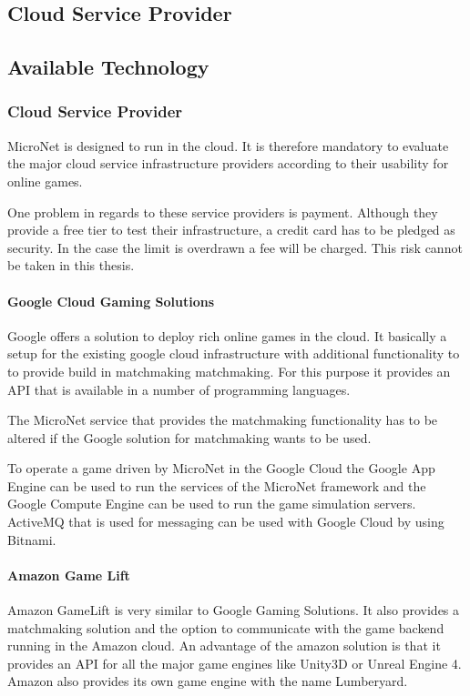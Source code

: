 \subsection{Cloud Service Provider}

\subsection{Available Technology}

\subsubsection{Cloud Service Provider}

MicroNet is designed to run in the cloud. It is therefore mandatory to evaluate
the major cloud service infrastructure providers according to their usability
for online games.

One problem in regards to these service providers is payment. Although they
provide a free tier to test their infrastructure, a credit card has to be
pledged as security. In the case the limit is overdrawn a fee will be charged.
This risk cannot be taken in this thesis. 

\paragraph{Google Cloud Gaming Solutions}

Google offers a solution to deploy rich online games in the cloud. It basically
a setup for the existing google cloud infrastructure with additional
functionality to to provide build in matchmaking matchmaking. For this purpose
it provides an API that is available in a number of programming languages.

The MicroNet service that provides the matchmaking functionality has to be
altered if the Google solution for matchmaking wants to be used. 

To operate a game driven by MicroNet in the Google Cloud the Google App Engine
can be used to run the services of the MicroNet framework and the Google Compute
Engine can be used to run the game simulation servers. ActiveMQ that is used for
messaging can be used with Google Cloud by using Bitnami.

\paragraph{Amazon Game Lift}

Amazon GameLift is very similar to Google Gaming Solutions. It also provides a
matchmaking solution and the option to communicate with the game backend running
in the Amazon cloud. An advantage of the amazon solution is that it provides an
API for all the major game engines like Unity3D or Unreal Engine 4. Amazon also
provides its own game engine with the name Lumberyard.

